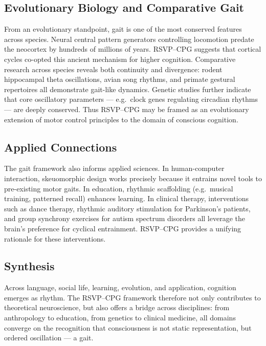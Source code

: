 \documentclass{article}
\begin{document}
\subsection{Evolutionary Biology and Comparative Gait}
From an evolutionary standpoint, gait is one of the most conserved features across species.  
Neural central pattern generators controlling locomotion predate the neocortex by hundreds of millions of years.  
RSVP--CPG suggests that cortical cycles co-opted this ancient mechanism for higher cognition.  
Comparative research across species reveals both continuity and divergence:  
rodent hippocampal theta oscillations, avian song rhythms, and primate gestural repertoires 
all demonstrate gait-like dynamics.  
Genetic studies further indicate that core oscillatory parameters --- e.g.\ clock genes regulating circadian rhythms --- 
are deeply conserved. Thus RSVP--CPG may be framed as an evolutionary extension of motor control principles 
to the domain of conscious cognition.  

\subsection{Applied Connections}
The gait framework also informs applied sciences.  
In human-computer interaction, skeuomorphic design works precisely because it entrains novel tools 
to pre-existing motor gaits. In education, rhythmic scaffolding (e.g.\ musical training, patterned recall) 
enhances learning. In clinical therapy, interventions such as dance therapy, rhythmic auditory stimulation 
for Parkinson’s patients, and group synchrony exercises for autism spectrum disorders all leverage 
the brain’s preference for cyclical entrainment. RSVP--CPG provides a unifying rationale for these interventions.  

\subsection{Synthesis}
Across language, social life, learning, evolution, and application, cognition emerges as rhythm.  
The RSVP--CPG framework therefore not only contributes to theoretical neuroscience, 
but also offers a bridge across disciplines: from anthropology to education, 
from genetics to clinical medicine, all domains converge on the recognition 
that consciousness is not static representation, but ordered oscillation --- a gait.  

\newpage


\end{document}
